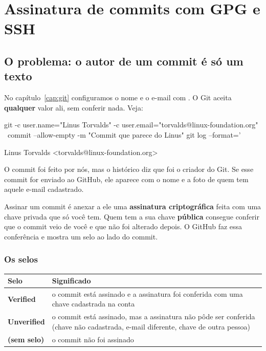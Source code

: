 \chapter{Assinatura de commits com GPG e SSH}
\label{cap:assinatura}

\section{O problema: o autor de um commit é só um texto}

No capítulo~\ref{cap:git} configuramos o nome e o e-mail com . O Git aceita \textbf{qualquer} valor ali, sem conferir nada. Veja:

\begin{bashcode}
git -c user.name="Linus Torvalds" -c user.email="torvalds@linux-foundation.org" \
    commit --allow-empty -m "Commit que parece do Linus"
git log --format='%
\end{bashcode}
\begin{saida}
Linus Torvalds <torvalds@linux-foundation.org>
\end{saida}

O commit foi feito por nós, mas o histórico diz que foi o criador do Git. Se esse commit for enviado ao GitHub, ele aparece com o nome e a foto de quem tem aquele e-mail cadastrado.

\begin{conceito}
Assinar um commit é anexar a ele uma \textbf{assinatura criptográfica} feita com uma chave privada que só você tem. Quem tem a sua chave \textbf{pública} consegue conferir que o commit veio de você e que não foi alterado depois. O GitHub faz essa conferência e mostra um selo ao lado do commit.
\end{conceito}

\subsection*{Os selos}

\begin{center}
\renewcommand{\arraystretch}{1.35}
\begin{tabularx}{\linewidth}{@{}>{\bfseries}l X@{}}
\toprule
\textbf{Selo} & \textbf{Significado} \\
\midrule
\color{verdeok}Verified & o commit está assinado e a assinatura foi conferida com uma chave cadastrada na conta \\
\color{vermelhoerro}Unverified & o commit está assinado, mas a assinatura não pôde ser conferida (chave não cadastrada, e-mail diferente, chave de outra pessoa) \\
\textrm{(sem selo)} & o commit não foi assinado \\
\bottomrule
\end{tabularx}
\end{center}

